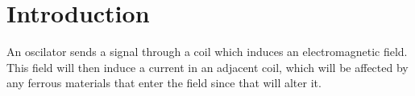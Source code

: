 \section{Introduction}
% 

An oscilator sends a signal through a coil which induces an electromagnetic field. This field will then induce a current in an adjacent coil,
which will be affected by any ferrous materials that enter the field since that will alter it. 